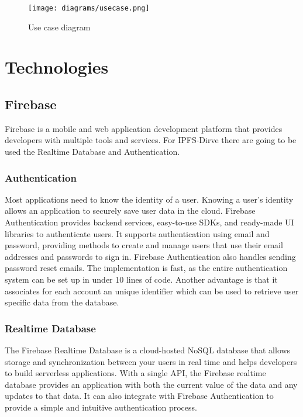 \documentclass[12pt]{report}
\begin{document}
\begin{figure}[H]
\centerline{\texttt{[image: diagrams/usecase.png]}}
    \caption{Use case diagram}
    \label{fig:usecase}
\end{figure}

\section{Technologies}

\subsection{Firebase}

Firebase \cite{firebase} is a mobile and web application development platform that provides developers with multiple tools and services. For IPFS-Dirve there are going to be used the Realtime Database and Authentication.

\subsubsection{Authentication}

Most applications need to know the identity of a user. Knowing a user's identity allows an application to securely save user data in the cloud. Firebase Authentication provides backend services, easy-to-use SDKs, and ready-made UI libraries to authenticate users. It supports authentication using email and password, providing methods to create and manage users that use their email addresses and passwords to sign in. Firebase Authentication also handles sending password reset emails. The implementation is fast, as the entire authentication system can be set up in under 10 lines of code.  Another advantage is that it associates for each account an unique identifier which can be used to retrieve user specific data from the database. 

\subsubsection{Realtime Database}

The Firebase Realtime Database is a cloud-hosted NoSQL database that allows storage and synchronization between your users in real time and helps developers to build serverless applications. With a single API, the Firebase realtime database provides an application with both the current value of the data and any updates to that data. It can also integrate with Firebase Authentication to provide a simple and intuitive authentication process.
\end{document}
